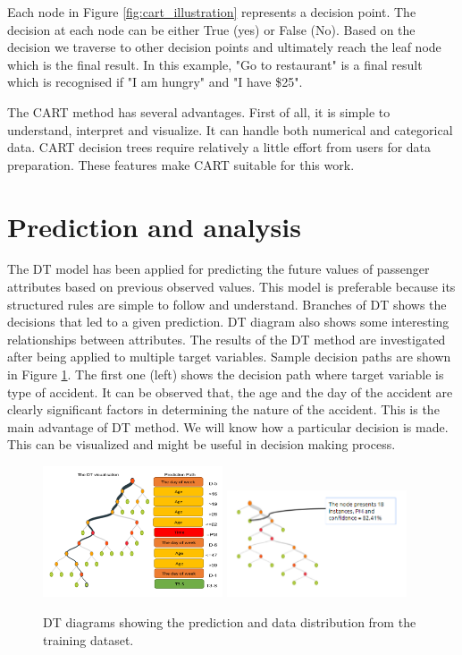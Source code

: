 Each node in Figure \ref{fig:cart_illustration} represents a decision point. The decision at each node can be either True (yes) or False (No). Based on the decision we traverse to other decision points and ultimately reach the leaf node which is the final result. In this example, "Go to restaurant" is a final result which is recognised if "I am hungry" and "I have \$25".

The CART method has several advantages. First of all, it is simple to understand, interpret and visualize. It can handle both numerical and categorical data. CART decision trees require relatively a little effort from users for data preparation. These features make CART suitable for this work.

\section{Prediction and analysis}
The DT model has been applied for predicting the future values of passenger attributes based on previous observed values. This model is preferable because its structured rules are simple to follow and understand. Branches of DT shows the decisions that led to a given prediction. DT diagram also shows some interesting relationships between attributes. The results of the DT method are investigated after being applied to multiple target variables. Sample decision paths are shown in Figure \ref{fig:sample_dts}. The first one (left) shows the decision path where target variable is type of accident. It can be observed that, the age and the day of the accident are clearly significant factors in determining the nature of the accident. This is the main advantage of DT method. We will know how a particular decision is made. This can be visualized and might be useful in decision making process. 

\begin{figure}
   \includegraphics[width=0.475\textwidth]{chapters/images/dt_1.png}
   \hfill
   \includegraphics[width=0.475\textwidth]{chapters/images/dt_2.png}
   \caption{DT diagrams showing the prediction and data distribution from the training dataset.}
   \label{fig:sample_dts}
\end{figure}


